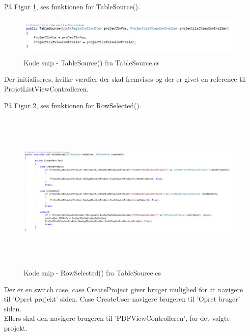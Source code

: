 På Figur \ref{fig:TableSource}, ses funktionen for TableSource().
\begin{figure}[H] %
	\centering
	\includegraphics[height=2cm, width=15cm]{../ArkitekturDesign/Design/ProjectList/TableSource}
	\caption{Kode snip - TableSource() fra TableSource.cs}
	\label{fig:TableSource}
\end{figure}
Der initialiseres, hvilke værdier der skal fremvises og der er givet en reference til ProjctListViewControlleren.

På Figur \ref{fig:RowSelection}, ses funktionen for RowSelected().
\begin{figure}[H] %
	\centering
	\includegraphics[height=8cm, width=17cm]{../ArkitekturDesign/Design/ProjectList/RowSelection}
	\caption{Kode snip - RowSelected() fra TableSource.cs}
	\label{fig:RowSelection}
\end{figure}
Der er en switch case, case CreateProject giver bruger mulighed for at navigere til 'Opret projekt' siden. Case CreateUser navigere brugeren til 'Opret bruger' siden. \\
Ellers skal den navigere brugeren til 'PDFViewControlleren', for det valgte projekt.

\clearpage
